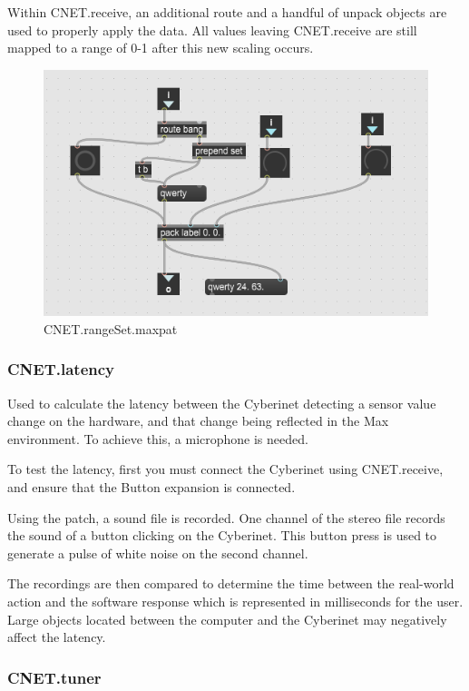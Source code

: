 Within CNET.receive, an additional route and a handful of unpack objects are used to properly apply the data. All values leaving CNET.receive are still mapped to a range of 0-1 after this new scaling occurs.

\begin{figure}
    \centering
    \includegraphics{diagrams/maxPatches/CNET.rangeSet.png}
    \caption{CNET.rangeSet.maxpat}
    \label{fig:CNET.rangeSet.maxpatch}
\end{figure}

\subsubsection{CNET.latency~}
Used to calculate the latency between the Cyberinet detecting a sensor value change on the hardware, and that change being reflected in the Max environment. To achieve this, a microphone is needed. 

To test the latency, first you must connect the Cyberinet using CNET.receive, and ensure that the Button expansion is connected. 

Using the patch, a sound file is recorded. One channel of the stereo file records the sound of a button clicking on the Cyberinet. This button press is used to generate a pulse of white noise on the second channel.

The recordings are then compared to determine the time between the real-world action and the software response which is represented in milliseconds for the user. Large objects located between the computer and the Cyberinet may negatively affect the latency.

\subsubsection{CNET.tuner~}


